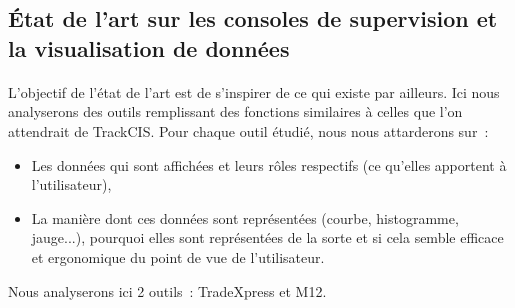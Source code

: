 		\subsection{État de l'art sur les consoles de supervision et la visualisation de données}
			\paragraph{}
			L'objectif de l'état de l'art est de s'inspirer de ce qui existe par
			ailleurs.
			Ici nous analyserons des outils remplissant des
			fonctions similaires à celles que l’on attendrait de TrackCIS. Pour chaque
			outil étudié, nous nous attarderons sur~:
			\begin{itemize}
			  \item Les données qui sont affichées et leurs rôles respectifs (ce qu'elles
			  apportent à l'utilisateur),
			  \item La manière dont ces données sont représentées (courbe, histogramme,
			  jauge...), pourquoi elles sont représentées de la sorte et si cela semble
			  efficace et ergonomique du point de vue de l’utilisateur.
			\end{itemize}
			Nous analyserons ici 2 outils~: TradeXpress et M12.
			
